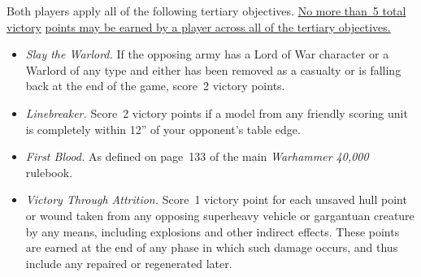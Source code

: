   Both players apply all of
the following tertiary objectives.  \underline{No more than~5 total
  victory} \underline{points may be earned by a player across all of
  the tertiary objectives.}

\begin{itemize}
\item \textit{Slay the Warlord.}  If the opposing army has a Lord of
  War character or a Warlord of any type and either has been removed
  as a casualty or is falling back at the end of the game, score~2
  victory points.

\item \textit{Linebreaker.}  Score~2 victory points if a model from
  any friendly scoring unit is completely within 12'' of your
  opponent's table edge.

\item \textit{First Blood.}  As defined on page~133 of the main
  \emph{Warhammer 40,000} rulebook.

\item \textit{Victory Through Attrition.}  Score~1 victory point for
  each unsaved hull point or wound taken from any opposing superheavy
  vehicle or gargantuan creature by any means, including explosions
  and other indirect effects.  These points are earned at the end of
  any phase in which such damage occurs, and thus include any repaired
  or regenerated later.
\end{itemize}
